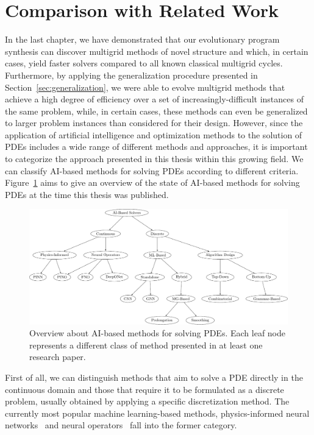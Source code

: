 \section{Comparison with Related Work}
In the last chapter, we have demonstrated that our evolutionary program synthesis can discover multigrid methods of novel structure and which, in certain cases, yield faster solvers compared to all known classical multigrid cycles.
Furthermore, by applying the generalization procedure presented in  Section~\ref{sec:generalization}, we were able to evolve multigrid methods that achieve a high degree of efficiency over a set of increasingly-difficult instances of the same problem, while, in certain cases, these methods can even be generalized to larger problem instances than considered for their design.
However, since the application of artificial intelligence and optimization methods to the solution of PDEs includes a wide range of different methods and approaches, it is important to categorize the approach presented in this thesis within this growing field.
We can classify AI-based methods for solving PDEs according to different criteria.
Figure~\ref{fig:overview-ai-based-methods} aims to give an overview of the state of AI-based methods for solving PDEs at the time this thesis was published.
\begin{figure}
	\includegraphics[width=\textwidth]{figures/trees/related_work.pdf}
	\caption{Overview about AI-based methods for solving PDEs. Each leaf node represents a different class of method presented in at least one research paper.}
	\label{fig:overview-ai-based-methods}
\end{figure}
First of all, we can distinguish methods that aim to solve a PDE directly in the continuous domain and those that require it to be formulated as a discrete problem, usually obtained by applying a specific discretization method.
The currently most popular machine learning-based methods, physics-informed neural networks~\cite{karniadakis2021physics,raissi2019physics,kharazmi2019variational,kharazmi2021hp} and neural operators~\cite{li2020fourier,guibas2021efficient,lu2021learning,li2021physics} fall into the former category.
